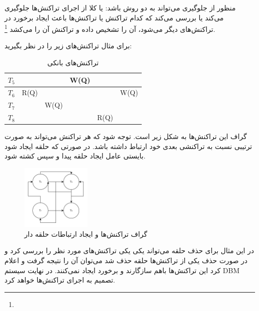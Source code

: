 \documentclass[a4paper]{article}
\begin{document}
منظور از جلوگیری می‌تواند به دو روش باشد: یا کلا از اجرای تراکنش‌ها جلوگیری
می‌کند یا بررسی می‌کند که کدام تراکنش یا تراکنش‌ها باعث ایجاد برخورد در
تراکنش‌های دیگر می‌شود، آن را تشخیص داده و تراکنش آن را می‌کشد \footnote{}.

\newpage

برای مثال تراکنش‌های زیر را در نظر بگیرید:

\begin{LTR}
    \begin{table}[h]
        \centering
        \begin{RTL}
            \caption{تراکنش‌های بانکی}
        \end{RTL}
        \begin{tabular}{|c|c|c|c|c|c|}
            \hline
            $T_{5}$ & & & W(Q) & & \\ \hline
            $T_{6}$ & R(Q) & & & & W(Q) \\ \hline
            $T_{7}$ & & W(Q) & & & \\ \hline
            $T_{8}$ & & & & R(Q) & \\ \hline
        \end{tabular}
    \end{table}
\end{LTR}

گراف این تراکنش‌ها به شکل زیر است. توجه شود که هر تراکنش می‌تواند به صورت ترتیبی
نسبت به تراکنشی بعدی خود ارتباط داشته باشد. در صورتی که حلقه ایجاد شود بایستی
عامل ایجاد حلقه پیدا و سپس کشته شود.

\newpage

\begin{figure}
    \centering
    \includegraphics[width=0.3\textwidth]{umls/exp1_serializable_graph.jpg}
    \caption{گراف تراکنش‌ها و ایجاد ارتباطات حلقه دار}
    \label{fig: diagram}
\end{figure}

در این مثال برای حذف حلقه می‌تواند یکی یکی تراکنش‌های مورد نظر را بررسی کرد و در
صورت حذف یکی از تراکنش‌ها حلقه حذف شد می‌توان آن را نتیجه گرفت و اعلام کرد این
تراکنش‌ها باهم سازگارند و برخورد ایجاد نمی‌کنند. در نهایت سیستم DBM تصمیم به
اجرای تراکنش‌ها خواهد کرد.
\end{document}
